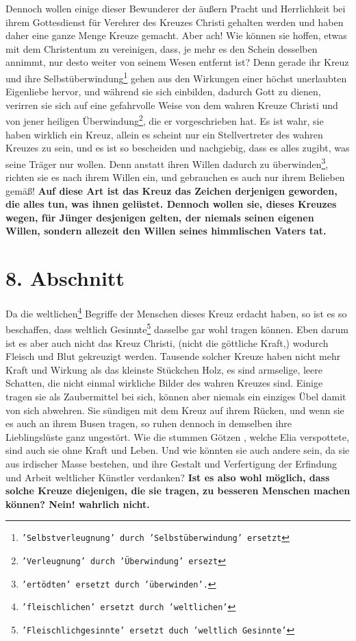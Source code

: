  Dennoch wollen einige dieser Bewunderer der äußern
Pracht und Herrlichkeit bei
ihrem Gottesdienst für Verehrer des Kreuzes Christi gehalten werden und haben
daher eine ganze Menge Kreuze gemacht. Aber ach! Wie können sie hoffen, etwas
mit dem Christentum zu vereinigen, dass, je mehr es den Schein desselben
annimmt, nur desto weiter von seinem Wesen entfernt ist? Denn gerade ihr Kreuz
und ihre Selbstüberwindung\footnote{\texttt{'Selbstverleugnung' durch
'Selbstüberwindung' ersetzt}}
gehen aus den Wirkungen einer höchst unerlaubten
Eigenliebe hervor, und während sie sich einbilden, dadurch
Gott zu dienen,
verirren sie sich auf eine gefahrvolle Weise von dem wahren Kreuze Christi und
von jener heiligen Überwindung\footnote{\texttt{'Verleugnung' durch 'Überwindung'
ersezt}}, die er vorgeschrieben hat. Es ist wahr, sie
haben wirklich ein Kreuz, allein es scheint nur ein Stellvertreter des wahren
Kreuzes zu sein, und es ist so bescheiden und
nachgiebig, dass es alles zugibt,
was seine Träger nur wollen. Denn anstatt ihren Willen dadurch zu
überwinden\footnote{\texttt{'ertödten' ersetzt durch 'überwinden'.}},
richten sie es nach ihrem Willen ein, und gebrauchen es auch nur ihrem Belieben
gemäß! \label{ref:05_07_kreuz}
\textbf{Auf diese Art ist das Kreuz das Zeichen derjenigen geworden, die
alles
tun, was ihnen gelüstet. Dennoch wollen sie, dieses Kreuzes wegen, für Jünger
desjenigen gelten, der niemals seinen eigenen Willen, sondern allezeit den
Willen seines himmlischen Vaters tat.}

\section{8. Abschnitt} \label{kap5_ab8}

 Da die weltlichen\footnote{\texttt{'fleischlichen'
ersetzt durch 'weltlichen'}} Begriffe der Menschen dieses Kreuz erdacht haben,
so ist es so beschaffen, dass weltlich
Gesinnte\footnote{\texttt{'Fleischlichgesinnte' ersetzt
duch 'weltlich Gesinnte'}} dasselbe gar wohl tragen können. Eben
darum ist es aber auch nicht das Kreuz Christi, (nicht die göttliche Kraft,)
wodurch Fleisch und Blut gekreuzigt werden. Tausende solcher Kreuze haben nicht
mehr Kraft und Wirkung als das kleinste Stückchen Holz, es sind armselige,
leere Schatten, die nicht einmal wirkliche Bilder des wahren Kreuzes sind.
Einige tragen sie als Zaubermittel bei sich, können aber niemals ein einziges
Übel damit von sich abwehren. Sie sündigen mit dem Kreuz auf ihrem Rücken, und
wenn sie es auch an ihrem Busen tragen, so ruhen dennoch in demselben ihre
Lieblingslüste ganz ungestört. Wie die stummen Götzen , welche Elia  verspottete,
sind auch sie ohne Kraft und Leben. Und wie könnten sie auch andere sein, da sie
aus irdischer Masse bestehen, und ihre Gestalt und Verfertigung der Erfindung
und Arbeit weltlicher Künstler verdanken? \label{ref:05_08_kreuz}
\textbf{Ist es also wohl möglich, dass solche
Kreuze diejenigen, die sie tragen, zu besseren Menschen machen können? Nein!
wahrlich nicht.}

